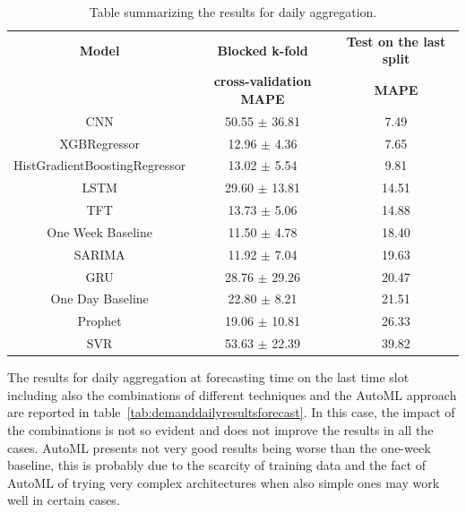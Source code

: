 \begin{table}[H]
\centering
\begin{tabular}{|c|c|c|}
\hline
\textbf{Model} & \textbf{Blocked k-fold} & \textbf{Test on the last split}\\
 & \textbf{cross-validation MAPE} & \textbf{MAPE}\\
\hline
CNN & 50.55 $\pm$ 36.81 & 7.49\\
\hline
XGBRegressor & 12.96 $\pm$ 4.36 & 7.65\\
\hline
HistGradientBoostingRegressor & 13.02 $\pm$ 5.54 & 9.81\\
\hline
LSTM & 29.60 $\pm$ 13.81 & 14.51\\
\hline
TFT & 13.73 $\pm$ 5.06 & 14.88\\
\hline
One Week Baseline & 11.50 $\pm$ 4.78 & 18.40\\
\hline
SARIMA & 11.92 $\pm$ 7.04 & 19.63\\
\hline
GRU & 28.76 $\pm$ 29.26 & 20.47\\
\hline
One Day Baseline & 22.80 $\pm$ 8.21 & 21.51\\
\hline
Prophet & 19.06 $\pm$ 10.81 & 26.33\\
\hline
SVR & 53.63 $\pm$ 22.39 & 39.82\\
\hline
\end{tabular}
\caption{Table summarizing the results for daily aggregation.}
\label{tab:demanddailyresults}
\end{table}

The results for daily aggregation at forecasting time on the last time slot including also the combinations of different techniques and the AutoML approach are reported in table~\ref{tab:demanddailyresultsforecast}.
In this case, the impact of the combinations is not so evident and does not improve the results in all the cases.
AutoML presents not very good results being worse than the one-week baseline, this is probably due to the scarcity of training data and the fact of AutoML of trying very complex architectures when also simple ones may work well in certain cases.

